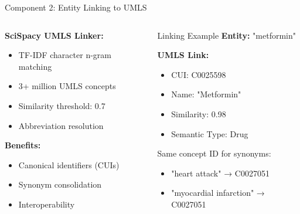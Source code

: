 \documentclass[aspectratio=169, 11pt]{beamer}
\begin{document}
\begin{frame}{Component 2: Entity Linking to UMLS}
    \vspace{0.3cm}
    \begin{columns}[T]
        \begin{column}{0.5\textwidth}
            \textbf{SciSpacy UMLS Linker:}
            \begin{itemize}
                \setlength{\itemsep}{0.2cm}
                \item TF-IDF character n-gram matching
                \item 3+ million UMLS concepts
                \item Similarity threshold: 0.7
                \item Abbreviation resolution
            \end{itemize}
            
            \vspace{0.4cm}
            \textbf{Benefits:}
            \begin{itemize}
                \setlength{\itemsep}{0.2cm}
                \item Canonical identifiers (CUIs)
                \item Synonym consolidation
                \item Interoperability
            \end{itemize}
        \end{column}
        \begin{column}{0.5\textwidth}
            \vspace{0.3cm}
            \begin{exampleblock}{Linking Example}
                \footnotesize
                \textbf{Entity:} "metformin"
                
                \textbf{UMLS Link:}
                \begin{itemize}
                    \item CUI: C0025598
                    \item Name: "Metformin"
                    \item Similarity: 0.98
                    \item Semantic Type: Drug
                \end{itemize}
            \end{exampleblock}
            
            \vspace{0.4cm}
            Same concept ID for synonyms:
            \begin{itemize}
                \setlength{\itemsep}{0.1cm}
                \item "heart attack" → C0027051
                \item "myocardial infarction" → C0027051
            \end{itemize}
        \end{column}
    \end{columns}
\end{frame}
\end{document}
